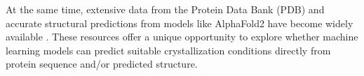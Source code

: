 At the same time, extensive data from the Protein Data Bank (PDB) and accurate structural predictions from models like AlphaFold2 have become widely available \parencite{Jumper2021}. These resources offer a unique opportunity to explore whether machine learning models can predict suitable crystallization conditions directly from protein sequence and/or predicted structure.








